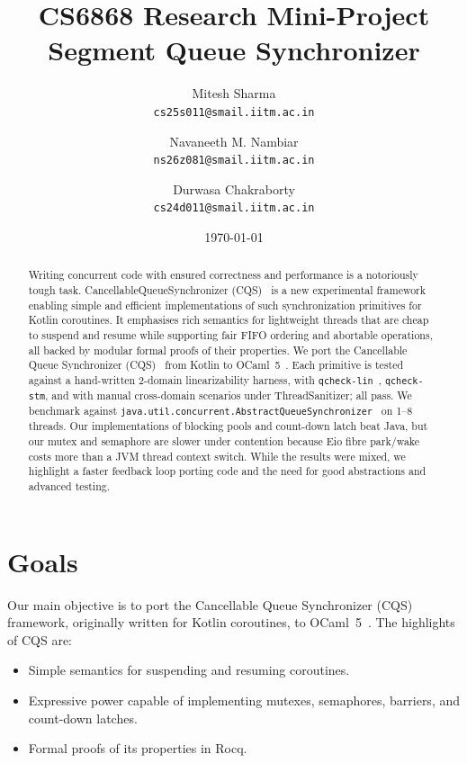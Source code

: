 \documentclass[11pt,a4paper]{article}
\title{%
  \textbf{CS6868 Research Mini-Project} \\[0.3em]
  \Large Segment Queue Synchronizer%
}
\author{%
  Mitesh Sharma \\ \texttt{cs25s011@smail.iitm.ac.in}
  \and
  Navaneeth M. Nambiar \\ \texttt{ns26z081@smail.iitm.ac.in}
  \and
  Durwasa Chakraborty \\ \texttt{cs24d011@smail.iitm.ac.in}
}
\date{\today}
\begin{document}
\maketitle


\begin{abstract}
Writing concurrent code with ensured correctness and performance is a
notoriously tough task. CancellableQueueSynchronizer
(CQS)~\cite{koval2023cqs} is a new experimental framework enabling simple
and efficient implementations of such synchronization primitives for
Kotlin coroutines. It emphasises rich semantics for lightweight threads
that are cheap to suspend and resume while supporting fair FIFO ordering
and abortable operations, all backed by modular formal proofs of their
properties. We port the Cancellable Queue Synchronizer
(CQS)~\cite{koval2023cqs} from Kotlin to
OCaml~5~\cite{kcsrk2020}. Each primitive is tested against a hand-written
2-domain linearizability harness, with \texttt{qcheck-lin}~\cite{qcheck},
\texttt{qcheck-stm}, and with manual cross-domain scenarios under
ThreadSanitizer; all pass. We benchmark against
\texttt{java.util.concurrent.AbstractQueueSynchronizer}~\cite{lea2005aqs}
on 1--8 threads. Our implementations of blocking pools and count-down
latch beat Java, but our mutex and semaphore are slower under contention
because Eio fibre park/wake costs more than a JVM thread context switch.
While the results were mixed, we highlight a faster feedback loop porting
code and the need for good abstractions and advanced testing.
\end{abstract}

\section{Goals}
\label{sec:goals}

Our main objective is to port the Cancellable Queue Synchronizer
(CQS)~\cite{koval2023cqs} framework, originally written for Kotlin
coroutines, to OCaml~5~\cite{kcsrk2020}. The highlights of CQS are:

\begin{itemize}[leftmargin=1.5em,nosep]
  \item Simple semantics for suspending and resuming coroutines.
  \item Expressive power capable of implementing mutexes, semaphores,
        barriers, and count-down latches.
  \item Formal proofs of its properties in Rocq.
\end{itemize}
\end{document}
